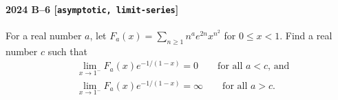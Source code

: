 \paragraph{2024 B--6 \textnormal{[\texttt{asymptotic, limit-series}]}}
For a real number $a$, let $F_a(x) = \sum_{n \geq 1} n^a e^{2n} x^{n^2}$ for $0 \leq x < 1$.
Find a real number $c$ such that
\begin{align*}
& \lim_{x \to 1^-} F_a(x) e^{-1/(1-x)} = 0 \qquad \mbox{for all $a < c$, and} \\
& \lim_{x \to 1^-} F_a(x) e^{-1/(1-x)} = \infty \qquad \mbox{for all $a > c$.}
\end{align*}
